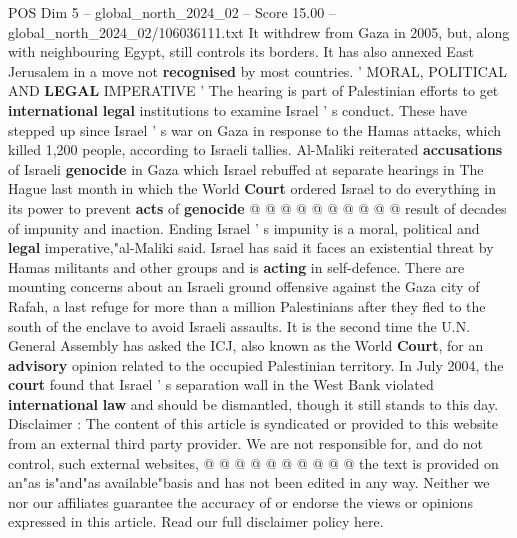 \begin{textsample}{POS Dim 5 – global\_north\_2024\_02 – Score 15.00 – global\_north\_2024\_02/106036111.txt}
It withdrew from Gaza in 2005, but, along with neighbouring Egypt, still controls its borders.
It has also annexed East Jerusalem in a move not \textbf{recognised} by most countries. ' MORAL, POLITICAL AND \textbf{LEGAL} IMPERATIVE ' The hearing is part of Palestinian efforts to get \textbf{international} \textbf{legal} institutions to examine Israel ' s conduct.
These have stepped up since Israel ' s war on Gaza in response to the Hamas attacks, which killed 1,200 people, according to Israeli tallies.
Al-Maliki reiterated \textbf{accusations} of Israeli \textbf{genocide} in Gaza which Israel rebuffed at separate hearings in The Hague last month in which the World \textbf{Court} ordered Israel to do everything in its power to prevent \textbf{acts} of \textbf{genocide} @ @ @ @ @ @ @ @ @ @ result of decades of impunity and inaction.
Ending Israel ' s impunity is a moral, political and \textbf{legal} imperative,"al-Maliki said.
Israel has said it faces an existential threat by Hamas militants and other groups and is \textbf{acting} in self-defence.
There are mounting concerns about an Israeli ground offensive against the Gaza city of Rafah, a last refuge for more than a million Palestinians after they fled to the south of the enclave to avoid Israeli assaults.
It is the second time the U.N.
General Assembly has asked the ICJ, also known as the World \textbf{Court}, for an \textbf{advisory} opinion related to the occupied Palestinian territory.
In July 2004, the \textbf{court} found that Israel ' s separation wall in the West Bank violated \textbf{international} \textbf{law} and should be dismantled, though it still stands to this day.
Disclaimer : The content of this article is syndicated or provided to this website from an external third party provider.
We are not responsible for, and do not control, such external websites, @ @ @ @ @ @ @ @ @ @ the text is provided on an"as is"and"as available"basis and has not been edited in any way.
Neither we nor our affiliates guarantee the accuracy of or endorse the views or opinions expressed in this article.
Read our full disclaimer policy here.

\end{textsample}
